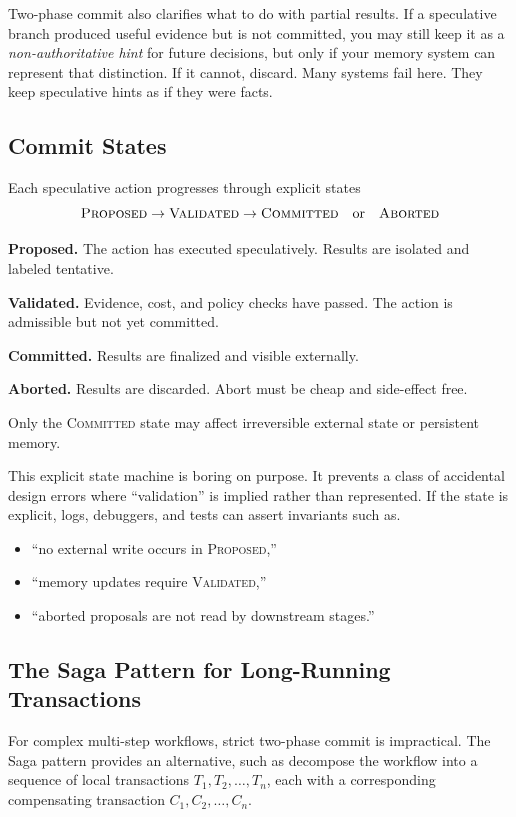 Two-phase commit also clarifies what to do with partial results. If a speculative branch produced useful evidence but is not committed, you may still keep it as a \emph{non-authoritative hint} for future decisions, but only if your memory system can represent that distinction. If it cannot, discard. Many systems fail here. They keep speculative hints as if they were facts.

\subsection{Commit States}

Each speculative action progresses through explicit states
\[
\textsc{Proposed} \rightarrow \textsc{Validated} \rightarrow \textsc{Committed} \quad \text{or} \quad \textsc{Aborted}
\]

\textbf{Proposed.} The action has executed speculatively. Results are isolated and labeled tentative.

\textbf{Validated.} Evidence, cost, and policy checks have passed. The action is admissible but not yet committed.

\textbf{Committed.} Results are finalized and visible externally.

\textbf{Aborted.} Results are discarded. Abort must be cheap and side-effect free.

Only the \textsc{Committed} state may affect irreversible external state or persistent memory.

This explicit state machine is boring on purpose. It prevents a class of accidental design errors where ``validation'' is implied rather than represented. If the state is explicit, logs, debuggers, and tests can assert invariants such as.
\begin{itemize}
\item ``no external write occurs in \textsc{Proposed},''
\item ``memory updates require \textsc{Validated},''
\item ``aborted proposals are not read by downstream stages.''
\end{itemize}

\subsection{The Saga Pattern for Long-Running Transactions}

For complex multi-step workflows, strict two-phase commit is impractical. The Saga pattern \cite{garciamolina1987sagas} provides an alternative, such as decompose the workflow into a sequence of local transactions $T_1, T_2, \ldots, T_n$, each with a corresponding compensating transaction $C_1, C_2, \ldots, C_n$.

